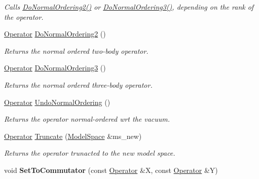 \begin{DoxyCompactItemize}
\begin{DoxyCompactList}\small\item\em Calls \hyperlink{classOperator_a652d989590422a2b26e662625b07254e}{Do\+Normal\+Ordering2()} or \hyperlink{classOperator_a7fd029569796107c87ff17c5a7912480}{Do\+Normal\+Ordering3()}, depending on the rank of the operator. \end{DoxyCompactList}\item 
\hyperlink{classOperator}{Operator} \hyperlink{classOperator_a652d989590422a2b26e662625b07254e}{Do\+Normal\+Ordering2} ()
\begin{DoxyCompactList}\small\item\em Returns the normal ordered two-\/body operator. \end{DoxyCompactList}\item 
\hyperlink{classOperator}{Operator} \hyperlink{classOperator_a7fd029569796107c87ff17c5a7912480}{Do\+Normal\+Ordering3} ()
\begin{DoxyCompactList}\small\item\em Returns the normal ordered three-\/body operator. \end{DoxyCompactList}\item 
\hyperlink{classOperator}{Operator} \hyperlink{classOperator_a1932dcab2be6bb889320254cc81dd5f4}{Undo\+Normal\+Ordering} ()
\begin{DoxyCompactList}\small\item\em Returns the operator normal-\/ordered wrt the vacuum. \end{DoxyCompactList}\item 
\hyperlink{classOperator}{Operator} \hyperlink{classOperator_ac2eb154c97ceff6f86cd3d24ddb4da1f}{Truncate} (\hyperlink{classModelSpace}{Model\+Space} \&ms\+\_\+new)
\begin{DoxyCompactList}\small\item\em Returns the operator trunacted to the new model space. \end{DoxyCompactList}\item 
void {\bfseries Set\+To\+Commutator} (const \hyperlink{classOperator}{Operator} \&X, const \hyperlink{classOperator}{Operator} \&Y)\hypertarget{classOperator_afeebc062fa99c993e65e46a99b1008d7}{}\label{classOperator_afeebc062fa99c993e65e46a99b1008d7}


\end{DoxyCompactItemize}
